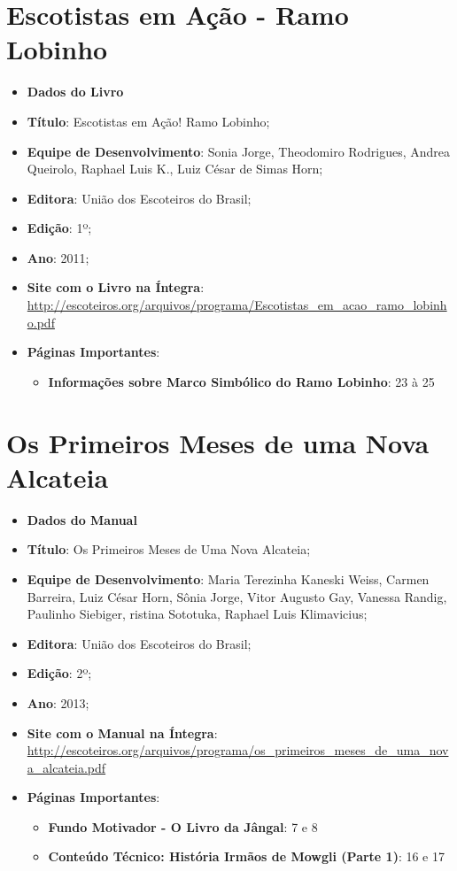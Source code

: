 	\section[Escotistas em Ação - Ramo Lobinho]{Escotistas em Ação - Ramo Lobinho}
	\label{sec:referencias_escotistasEmAcaoRamoLobinho}
		\begin{itemize}
			\item[]{\textbf{Dados do Livro}}
			\item{\textbf{Título}: Escotistas em Ação! Ramo Lobinho;}
			\item{\textbf{Equipe de Desenvolvimento}: Sonia Jorge, Theodomiro Rodrigues, Andrea Queirolo, Raphael Luis K., Luiz César de Simas Horn;}
			\item{\textbf{Editora}: União dos Escoteiros do Brasil;}
			\item{\textbf{Edição}: 1º;}
			\item{\textbf{Ano}: 2011;}
			\item{\textbf{Site com o Livro na Íntegra}: \url{http://escoteiros.org/arquivos/programa/Escotistas_em_acao_ramo_lobinho.pdf}}
			\item{\textbf{Páginas Importantes}:
				\begin{itemize}
					\item{\textbf{Informações sobre Marco Simbólico do Ramo Lobinho}: 23 à 25}
				\end{itemize}}
		\end{itemize}

	\section[Os Primeiros Meses de uma Nova Alcateia]{Os Primeiros Meses de uma Nova Alcateia}
	\label{sec:referencias_alcateiaEmAcao}
		\begin{itemize}
			\item[]{\textbf{Dados do Manual}}
			\item{\textbf{Título}: Os Primeiros Meses de Uma Nova Alcateia;}
			\item{\textbf{Equipe de Desenvolvimento}: Maria Terezinha Kaneski Weiss, Carmen Barreira, Luiz César Horn, Sônia Jorge, Vitor Augusto Gay, Vanessa Randig, Paulinho Siebiger, ristina Sototuka, Raphael Luis Klimavicius;}
			\item{\textbf{Editora}: União dos Escoteiros do Brasil;}
			\item{\textbf{Edição}: 2º;}
			\item{\textbf{Ano}: 2013;}
			\item{\textbf{Site com o Manual na Íntegra}: \url{http://escoteiros.org/arquivos/programa/os_primeiros_meses_de_uma_nova_alcateia.pdf}}
			\item{\textbf{Páginas Importantes}:
				\begin{itemize}
					\item{\textbf{Fundo Motivador - O Livro da Jângal}: 7 e 8}
					\item{\textbf{Conteúdo Técnico: História Irmãos de Mowgli (Parte 1)}: 16 e 17}
				\end{itemize}}
		\end{itemize}